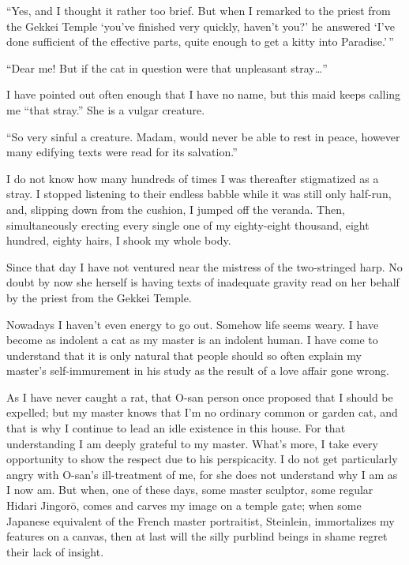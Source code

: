 \documentclass{book}
\begin{document}
``Yes, and I thought it rather too brief. But when I remarked to the
priest from the Gekkei Temple `you've finished very quickly, haven't
you?' he answered `I've done sufficient of the effective parts, quite
enough to get a kitty into Paradise.'\,''

``Dear me! But if the cat in question were that unpleasant
stray\ldots{}''

I have pointed out often enough that I have no name, but this maid keeps
calling me ``that stray.'' She is a vulgar creature.

``So very sinful a creature. Madam, would never be able to rest in
peace, however many edifying texts were read for its salvation.''

I do not know how many hundreds of times I was thereafter stigmatized as
a stray. I stopped listening to their endless babble while it was still
only half-run, and, slipping down from the cushion, I jumped off the
veranda. Then, simultaneously erecting every single one of my
eighty-eight thousand, eight hundred, eighty hairs, I shook my whole
body.

Since that day I have not ventured near the mistress of the two-stringed
harp. No doubt by now she herself is having texts of inadequate gravity
read on her behalf by the priest from the Gekkei Temple.

Nowadays I haven't even energy to go out. Somehow life seems weary. I
have become as indolent a cat as my master is an indolent human. I have
come to understand that it is only natural that people should so often
explain my master's self-immurement in his study as the result of a love
affair gone wrong.

As I have never caught a rat, that O-san person once proposed that I
should be expelled; but my master knows that I'm no ordinary common or
garden cat, and that is why I continue to lead an idle existence in this
house. For that understanding I am deeply grateful to my master. What's
more, I take every opportunity to show the respect due to his
perspicacity. I do not get particularly angry with O-san's ill-treatment
of me, for she does not understand why I am as I now am. But when, one
of these days, some master sculptor, some regular Hidari Jingorō, comes
and carves my image on a temple gate; when some Japanese equivalent of
the French master portraitist, Steinlein, immortalizes my features on a
canvas, then at last will the silly purblind beings in shame regret
their lack of insight.
\end{document}
